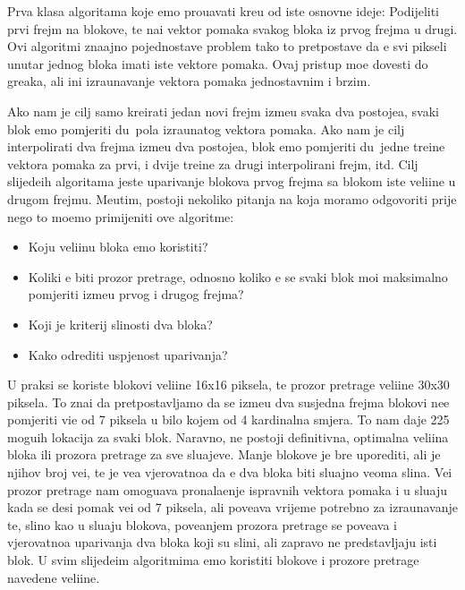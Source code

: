 Prva klasa algoritama koje \cj emo prou\ch avati kre\cj u od iste osnovne ideje: Podijeliti prvi frejm na blokove, te na\cj i vektor pomaka svakog bloka iz prvog frejma u drugi. Ovi algoritmi zna\ch ajno pojednostave problem tako \sh to
pretpostave da \cj e svi pikseli unutar jednog bloka imati iste vektore pomaka. Ovaj pristup mo\zh e dovesti do gre\sh aka, ali \ch ini izra\ch unavanje vektora pomaka jednostavnim i brzim\cite{blockmatching}.

Ako nam je cilj samo kreirati jedan novi frejm izme\dj u svaka dva postoje\cj a, svaki blok \cj emo pomjeriti du\zh\ pola izra\ch unatog vektora pomaka. Ako nam je cilj interpolirati dva frejma izme\dj u dva postoje\cj a, blok \cj emo 
pomjeriti du\zh\ jedne tre\cj ine vektora pomaka za prvi, i dvije tre\cj ine za drugi interpolirani frejm, itd. Cilj slijede\cj ih algoritama jeste uparivanje blokova prvog frejma sa blokom iste veli\ch ine u drugom frejmu. Me\dj utim,
postoji nekoliko pitanja na koja moramo odgovoriti prije nego \sh to mo\zh emo primijeniti ove algoritme:

\begin{itemize}
	\item Koju veli\ch inu bloka \cj emo koristiti?
	\item Koliki \cj e biti prozor pretrage, odnosno koliko \cj e se svaki blok mo\cj i maksimalno pomjeriti izme\dj u prvog i drugog frejma?
	\item Koji je kriterij sli\ch nosti dva bloka?
	\item Kako odrediti uspje\sh nost uparivanja?
\end{itemize}

U praksi se koriste blokovi veli\ch ine 16x16 piksela, te prozor pretrage veli\ch ine 30x30 piksela. To zna\ch i da pretpostavljamo da se izme\dj u dva susjedna frejma blokovi ne\cj e pomjeriti vi\sh e od 7 piksela u bilo kojem od 4
kardinalna smjera. To nam daje 225 mogu\cj ih lokacija za svaki blok. Naravno, ne postoji definitivna, optimalna veli\ch ina bloka ili prozora pretrage za sve slu\ch ajeve. Manje blokove je br\zh e uporediti, ali je njihov broj ve\cj i,
te je ve\cj a vjerovatno\cj a da \cj e dva bloka biti slu\ch ajno veoma sli\ch na. Ve\cj i prozor pretrage nam omogu\cj ava pronala\zh enje ispravnih vektora pomaka i u slu\ch aju kada se desi pomak ve\cj i od 7 piksela, ali
pove\cj ava vrijeme potrebno za izra\ch unavanje te, sli\ch no kao u slu\ch aju blokova, pove\cj anjem prozora pretrage se pove\cj ava i vjerovatno\cj a uparivanja dva bloka koji su sli\ch ni, ali zapravo ne
predstavljaju isti blok. U svim slijede\cj im algoritmima \cj emo koristiti blokove i prozore pretrage navedene veli\ch ine.

